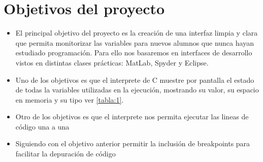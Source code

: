 \chapter{Objetivos del proyecto}

\begin{itemize}
\item El principal objetivo del proyecto es la creación de una interfaz limpia y clara que permita monitorizar las variables para nuevos alumnos que nunca hayan estudiado programación. Para ello nos basaremos en interfaces de desarrollo vistos en distintas clases prácticas: MatLab, Spyder y Eclipse.
\item Uno de los objetivos es que el interprete de C muestre por pantalla el estado de todas la variables utilizadas en la ejecución, mostrando su valor, su espacio en memoria y su tipo ver \ref{tabla:1}.


\item Otro de los objetivos es que el interprete nos permita ejecutar las lineas de código una a una
\item Siguiendo con el objetivo anterior permitir la inclusión de breakpoints para facilitar la depuración de código
\end{itemize}